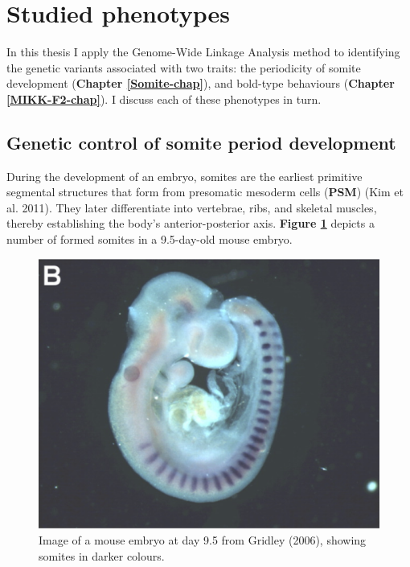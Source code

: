 \documentclass[
]{book}
\begin{document}
\hypertarget{studied-phenotypes}{%
\section{Studied phenotypes}\label{studied-phenotypes}}

In this thesis I apply the Genome-Wide Linkage Analysis method to identifying the genetic variants associated with two traits: the periodicity of somite development (\textbf{Chapter \ref{Somite-chap}}), and bold-type behaviours (\textbf{Chapter \ref{MIKK-F2-chap}}). I discuss each of these phenotypes in turn.

\hypertarget{genetic-control-of-somite-period-development}{%
\subsection{Genetic control of somite period development}\label{genetic-control-of-somite-period-development}}

During the development of an embryo, somites are the earliest primitive segmental structures that form from presomatic mesoderm cells (\textbf{PSM}) (Kim et al. 2011). They later differentiate into vertebrae, ribs, and skeletal muscles, thereby establishing the body's anterior-posterior axis. \textbf{Figure \ref{fig:mouse-embryo}} depicts a number of formed somites in a 9.5-day-old mouse embryo.


\begin{figure}

\hfill{}\includegraphics[width=1\linewidth]{figs/somites/mouse_embryo_gridley} 

\caption{Image of a mouse embryo at day 9.5 from Gridley (2006), showing somites in darker colours.}\label{fig:mouse-embryo}
\end{figure}
\end{document}

